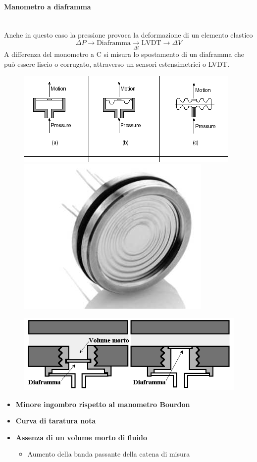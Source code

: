 \documentclass[a4paper, 15pt]{article}
\newcommand{\cmark}{\ding{51}}
\newcommand{\xmark}{\ding{55}}
\begin{document}
\begin{adjustwidth}{2in}{}
\paragraph{Manometro a diaframma} \mbox{} \\
  		Anche in questo caso la pressione provoca la deformazione di un elemento elastico
  		\[\Delta P \rightarrow \boxed{\text{Diaframma}}\underset{\Delta l}{\rightarrow}\boxed{\text{LVDT}}\rightarrow\Delta V\] 
  		A differenza del monometro a C si misura lo spostamento di un diaframma che può essere liscio o corrugato, attraverso un sensori estensimetrici o LVDT. 
  		\begin{figure}[H]
  			\centering
  			\includegraphics[width=0.3\linewidth]{immagini/manometro8}
  			\includegraphics[width=0.2\linewidth]{immagini/manometro9}
  			\label{fig:manometro8}
  			\label{fig:manometro9}
  		\end{figure}
  		\begin{figure}[H]
  			\centering
  			\includegraphics[width=0.5\linewidth]{immagini/manometro10}
  			\label{fig:manometro10}
  		\end{figure}
  		\begin{itemize}[label=\textcolor{green}{\cmark}]
  			\item \textbf{Minore ingombro rispetto al manometro Bourdon}
  			\item \textbf{Curva di taratura nota}
  			\item \textbf{Assenza di un volume morto di fluido}
  				\begin{itemize}[label=\textcolor{green}{\cmark}]
  				\item Aumento della banda passante della catena di misura
  				\end{itemize}
  			\begin{itemize}[label=\textcolor{red}{\xmark}]

\end{itemize}
\end{itemize}
\end{adjustwidth}
\end{document}
